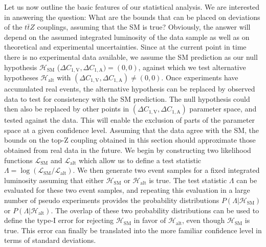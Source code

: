 \documentclass[preprint]{JHEP3}
\newcommand{\SM}{\mathrm{SM}}
\newcommand{\alt}{\mathrm{alt}}
\def\ttbZ{t\bar{t}Z}
\def\DConeA{\Delta C_{1,\mathrm{A}}}
\def\DConeV{\Delta C_{1,\mathrm{V}}}
\def\Halt{\mathcal{H}_{\mathrm{alt}}}
\begin{document}
Let us now outline the basic features of our statistical analysis.
We are interested in answering the question: What are the bounds that can be placed on deviations of the $\ttbZ$ couplings, assuming that the SM is true? 
Obviously, the answer will depend on the assumed integrated luminosity of the data sample as well as on theoretical and experimental uncertainties. 
Since at the current point in time there is no experimental data available, we assume the SM prediction as our null hypothesis 
$\mathcal{H}_{\mathrm{SM}}$ ($\DConeV,\DConeA)=(0,0)$,
against which we test alternative hypotheses $\Halt$ with $(\DConeV,\DConeA) \ne (0,0)$.
Once experiments have accumulated real events, the alternative hypothesis can be replaced by observed data to test for consistency with the SM prediction. 
The null hypothesis could then also be replaced by  other points in $(\DConeV,\DConeA)$ parameter space, and tested against the data. 
This will enable the exclusion of parts of the parameter space at a given confidence level. 
Assuming that the data agree with the SM, 
the bounds on the top-Z coupling 
obtained in this section should approximate those obtained from real data in the future. 
We begin by constructing two likelihood functions $\mathcal{L}_{\SM}$ and $\mathcal{L}_{\alt}$ which allow us to define a test 
statistic $\Lambda = \log \left( \mathcal{L}_{\SM} / \mathcal{L}_{\alt} \right)$.
We then generate two event samples for a fixed integrated luminosity assuming that either $\mathcal{H}_{\mathrm{SM}}$ or $\Halt$ is true.
The test statistic $\Lambda$ can be evaluated for these two event samples, and 
repeating this evaluation in a large number of pseudo experiments provides the probability distributions $P(\Lambda|\mathcal{H}_{\mathrm{SM}})$ or $P(\Lambda|\Halt)$.
The overlap of these two probability distributions can be used to define the type-I error for rejecting $\mathcal{H}_{\mathrm{SM}}$ in favor of $\Halt$, even though $\mathcal{H}_{\mathrm{SM}}$ is true.
This error can finally be translated into the more familiar confidence level in terms of standard deviations.
\end{document}
